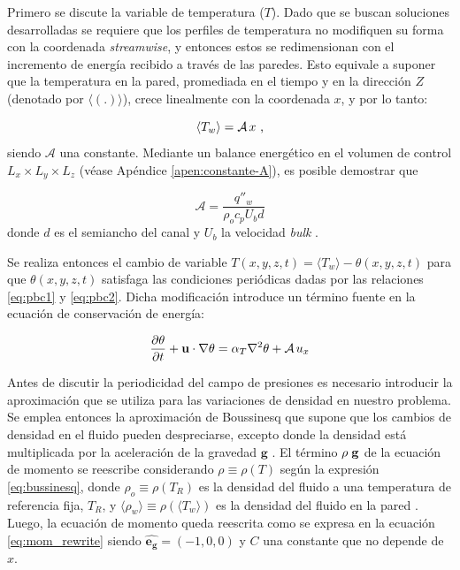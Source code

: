 Primero se discute la variable de temperatura ($T$). Dado que se buscan soluciones desarrolladas se requiere que los perfiles de temperatura no modifiquen su forma con la coordenada \textit{streamwise}, y entonces estos se redimensionan con el incremento de energía recibido a través de las paredes. Esto equivale a suponer que la temperatura en la pared, promediada en el tiempo y en la dirección $Z$ (denotado por $\langle (\text{.})\rangle$), crece linealmente con la coordenada $x$, y por lo tanto: 

$$
\langle T_w \rangle = \mathcal{A} \hspace{0.5mm} x \text{ ,}
$$
siendo $\mathcal{A}$ una constante. Mediante un balance energético en el volumen de control $L_x \times L_y \times L_z$ (véase Apéndice \ref{apen:constante-A}), es posible demostrar que

$$\mathcal{A} = \frac{q''_w}{\rho_o  c_p U_b d} $$ 
donde $d$ es el semiancho del canal y $U_b$ la velocidad \textit{bulk} \cite{pope2001turbulent}.

Se realiza entonces el cambio de variable $T(x,y,z,t) = \langle T_w \rangle - \theta(x,y,z,t)$ para que $\theta(x,y,z,t)$ satisfaga las condiciones periódicas dadas por las relaciones \ref{eq:pbc1} y \ref{eq:pbc2}. Dicha modificación introduce un término fuente en la ecuación de conservación de energía:

\begin{equation}
\frac{ \partial \theta }{ \partial t } + \mathbf{u} \cdot \nabla \theta = \alpha_{T} \nabla^2 \theta + \mathcal{A} \hspace{0.5mm} u_x 
\label{eq:energy_pcb_source}
\end{equation}

Antes de discutir la periodicidad del campo de presiones es necesario introducir la aproximación que se utiliza para las variaciones de densidad en nuestro problema. Se emplea entonces la aproximación de Boussinesq que supone que los cambios de densidad en el fluido pueden despreciarse, excepto donde la densidad está multiplicada por la aceleración de la gravedad $\mathbf{g}$ \cite{kundu}. El término $\rho \hspace{1mm} \mathbf{g}$ de la ecuación de momento se reescribe considerando $\rho \equiv \rho(T)$ según la expresión \ref{eq:bussinesq}, donde $\rho_o \equiv \rho(T_R)$ es la densidad del fluido a una temperatura de referencia fija, $T_R$, y $ \langle \rho_w \rangle \equiv \rho(\langle T_w \rangle)$ es la densidad del fluido en la pared \cite{incropera}. Luego, la ecuación de momento queda reescrita como se expresa en la ecuación \ref{eq:mom_rewrite} siendo $\mathbf{\hat{e_g}}=(-1,0,0)$ y $C$ una constante que no depende de $x$.

